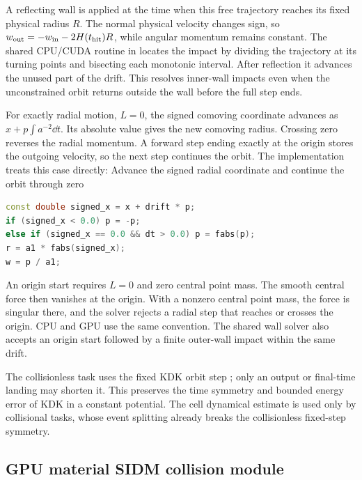 A reflecting wall is applied at the time when this free trajectory reaches
its fixed physical radius \(R\). The normal physical velocity changes sign,
so \(w_{\rm out}=-w_{\rm in}-2H(t_{\rm hit})R\), while angular momentum
remains constant. The shared CPU/CUDA routine in
 locates the impact by dividing the
trajectory at its turning points and bisecting each monotonic interval.
After reflection it advances the unused part of the drift. This resolves
inner-wall impacts even when the unconstrained orbit returns outside the
wall before the full step ends.

For exactly radial motion, \(L=0\), the signed comoving coordinate advances
as \(x+p\int a^{-2}\dd t\). Its absolute value gives the new comoving
radius. Crossing zero reverses the radial momentum. A forward step ending
exactly at the origin stores the outgoing velocity, so the next step
continues the orbit. The implementation treats this case directly:
{}
{Advance the signed radial coordinate and continue the orbit through zero}
\begin{lstlisting}[language=C++]
const double signed_x = x + drift * p;
if (signed_x < 0.0) p = -p;
else if (signed_x == 0.0 && dt > 0.0) p = fabs(p);
r = a1 * fabs(signed_x);
w = p / a1;
\end{lstlisting}
An origin start requires \(L=0\) and zero central point mass. The smooth
central force then vanishes at the origin. With a nonzero central point mass,
the force is singular there, and the solver rejects a radial step that
reaches or crosses the origin. CPU and GPU use the same convention. The
shared wall solver also accepts an origin start followed by a finite
outer-wall impact within the same drift.

The collisionless task uses the fixed KDK orbit step
; only an output or final-time landing may shorten
it.  This preserves the time symmetry and bounded energy error of KDK in a
constant potential.  The cell dynamical estimate is used only by collisional
tasks, whose event splitting already breaks the collisionless fixed-step
symmetry.

\subsection{GPU material SIDM collision module}

